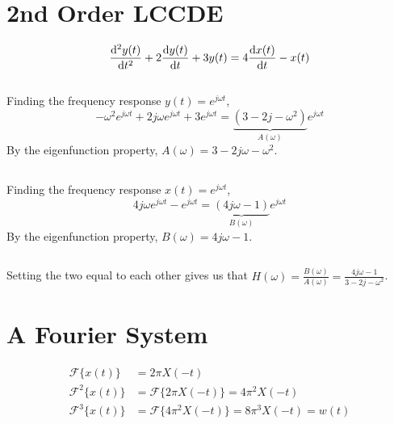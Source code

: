 \documentclass{article}
\newcommand{\F}{\mathcal{F}}
\begin{document}
\section{2nd Order LCCDE}

\begin{equation}
    \dv[2]{y(t)}{t} + 2\dv{y(t)}{t} + 3 y(t) = 4\dv{x(t)}{t} - x(t)
\end{equation}

\subsection{}

Finding the frequency response \(y(t) = e^{j \omega t}\),
\begin{equation}
    -\omega^2 e^{j \omega t} + 2j \omega e^{j \omega t} + 3 e^{j \omega t} = \underbrace{(3 - 2j - \omega^2)}_{A(\omega)} e^{j \omega t}
\end{equation}
By the eigenfunction property, \(A(\omega) = 3 - 2j \omega - \omega^2\).

\subsection{}

Finding the frequency response \(x(t) = e^{j \omega t}\),
\begin{equation}
    4j \omega e^{j \omega t} - e^{j \omega t} = \underbrace{(4j \omega - 1)}_{B(\omega)} e^{j \omega t}
\end{equation}
By the eigenfunction property, \(B(\omega) = 4j \omega - 1\).

\subsection{}

Setting the two equal to each other gives us that \(H(\omega) = \frac{B(\omega)}{A(\omega)} = \frac{4j \omega - 1}{3 - 2j - \omega^2}\).

\section{A Fourier System}

\begin{align}
    \F\{x(t)\} &= 2\pi X(-t) \\
    \F^2\{x(t)\} &= \F\{2\pi X(-t)\} = 4\pi^2 X(-t) \\
    \F^3\{x(t)\} &= \F\{4\pi^2 X(-t)\} = 8\pi^3 X(-t) = w(t)
\end{align}
\end{document}
